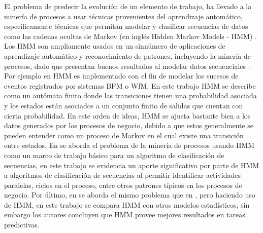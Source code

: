 El problema de predecir la evolución de un elemento de trabajo, ha llevado a la minería de procesos a usar técnicas provenientes del aprendizaje automático, específicamente técnicas que permitan modelar y clasificar secuencias de datos como las cadenas ocultas de Markov (en inglés Hidden Markov Models - HMM) \cite{Khreich2010}. Los HMM son ampliamente usados en un sinnúmero de aplicaciones de aprendizaje automático y reconocimiento de patrones, incluyendo la minería de procesos, dado que presentan buenos resultados al modelar datos secuenciales \cite{Rabiner1989}. Por ejemplo en \cite{Herbst1998} HMM es implementado con el fin de modelar los sucesos de eventos registrados por sistemas BPM o WfM. En este trabajo HMM se describe como un autómata finito donde las transiciones tienen una probabilidad asociada y los estados están asociados a un conjunto finito de salidas que cuentan con cierta probabilidad. En este orden de ideas, HMM se ajusta bastante bien a los datos generados por los procesos de negocio, debido a que estos generalmente se pueden entender como un proceso de Markov en el cual existe una transición entre estados. En \cite{DaSilva2009} se aborda el problema de la minería de procesos usando HMM como un marco de trabajo básico para un algoritmo de clasificación de secuencias, en este trabajo se evidencia un aporte significativo por parte de HMM a algoritmos de clasificación de secuencias al permitir identificar actividades paralelas, ciclos en el proceso, entre otros patrones típicos en los procesos de negocio. Por último, en \cite{Pandey2011} se aborda el mismo problema que en \cite{VanDerAalst2011}, pero haciendo uso de HMM, en este trabajo se compara HMM con otros modelos estadísticos, sin embargo los autores concluyen que HMM provee mejores resultados en tareas predictivas.

